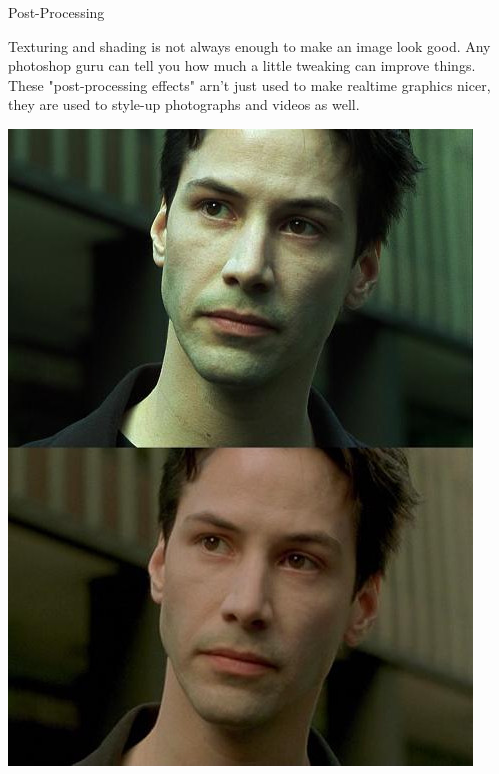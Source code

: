 \documentclass{lug}
\newcommand{\splitslide}[4]{
    \noindent
    \begin{minipage}{#1 \textwidth - #2 }
        #3
    \end{minipage}%
    \hspace{ \dimexpr #2 * 2 \relax }%
    \begin{minipage}{\textwidth - #1 \textwidth - #2 }
        #4
    \end{minipage}
}
\begin{document}
\begin{frame}{Post-Processing}
    \splitslide{0.65}{.7em}{
        \small

        Texturing and shading is not always enough to make an image look good.
        Any photoshop guru can tell you how much a little tweaking can improve
        things. These "post-processing effects" arn't just used to make
        realtime graphics nicer, they are used to style-up photographs and
        videos as well.

    }{
        \includegraphics[width=\textwidth]{graphics/color_grading.jpeg}
    }
\end{frame}
\end{document}
